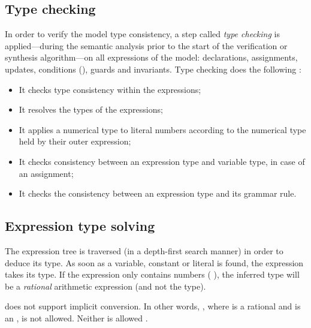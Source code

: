\subsection{Type checking}

In order to verify the model type consistency, a step called \emph{type checking} is applied---during the semantic analysis prior to the start of the verification or synthesis algorithm---on all expressions of the model: declarations, assignments, updates, conditions (), guards and invariants.
Type checking does the following :

\begin{itemize}
	\item It checks type consistency within the expressions;
	\item It resolves the types of the expressions;
	\item It applies a numerical type to literal numbers according to the numerical type held by their outer expression;
	\item It checks consistency between an expression type and variable type, in case of an assignment;
	\item It checks the consistency between an expression type and its grammar rule.
\end{itemize}

\subsection{Expression type solving}

The expression tree is traversed (in a depth-first search manner) in order to deduce its type.
As soon as a variable, constant or literal is found, the expression takes its type.
If the expression only contains numbers (\eg{} ), the inferred type will be a \emph{rational} arithmetic expression (and not the  type).

\imitator{} does not support implicit conversion.
In other words, , where  is a rational and  is an , is not allowed.
Neither is allowed .


